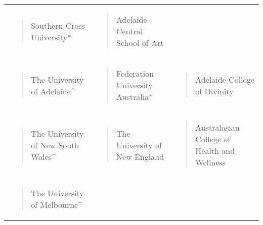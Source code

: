 \documentclass[]{book}
\begin{document}
\begin{longtable}[]{@{}lll@{}}
\begin{minipage}[t]{0.32\columnwidth}
\begin{quote}
Southern Cross University*
\end{quote}\strut
\end{minipage} & \begin{minipage}[t]{0.32\columnwidth}\raggedright
\begin{quote}
Adelaide Central School of Art
\end{quote}\strut
\end{minipage}\tabularnewline
\begin{minipage}[t]{0.32\columnwidth}\raggedright
\begin{quote}
The University of Adelaide\^{}
\end{quote}\strut
\end{minipage} & \begin{minipage}[t]{0.32\columnwidth}\raggedright
\begin{quote}
Federation University Australia*
\end{quote}\strut
\end{minipage} & \begin{minipage}[t]{0.32\columnwidth}\raggedright
\begin{quote}
Adelaide College of Divinity
\end{quote}\strut
\end{minipage}\tabularnewline
\begin{minipage}[t]{0.32\columnwidth}\raggedright
\begin{quote}
The University of New South Wales\^{}
\end{quote}\strut
\end{minipage} & \begin{minipage}[t]{0.32\columnwidth}\raggedright
\begin{quote}
The University of New England
\end{quote}\strut
\end{minipage} & \begin{minipage}[t]{0.32\columnwidth}\raggedright
\begin{quote}
Australasian College of Health and Wellness
\end{quote}\strut
\end{minipage}\tabularnewline
\begin{minipage}[t]{0.32\columnwidth}\raggedright
\begin{quote}
The University of Melbourne\^{}
\end{quote}\strut
\end{minipage} & \begin{minipage}[t]{0.32\columnwidth}\raggedright

\end{minipage}
\end{longtable}
\end{document}
